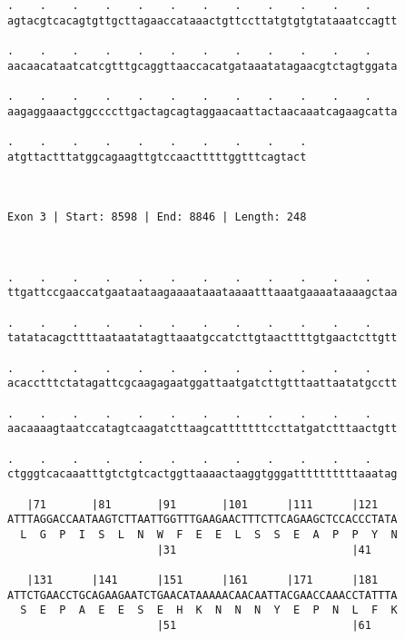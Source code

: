 \documentclass{article}
\begin{document}
\begin{Verbatim}
.    .    .    .    .    .    .    .    .    .    .    .    
agtacgtcacagtgttgcttagaaccataaactgttccttatgtgtgtataaatccagtt
                                                            
.    .    .    .    .    .    .    .    .    .    .    .    
aacaacataatcatcgtttgcaggttaaccacatgataaatatagaacgtctagtggata
                                                            
.    .    .    .    .    .    .    .    .    .    .    .    
aagaggaaactggccccttgactagcagtaggaacaattactaacaaatcagaagcatta
                                                            
.    .    .    .    .    .    .    .    .    .
atgttactttatggcagaagttgtccaactttttggtttcagtact
                                              
                                              
 
Exon 3 | Start: 8598 | End: 8846 | Length: 248



.    .    .    .    .    .    .    .    .    .    .    .    
ttgattccgaaccatgaataataagaaaataaataaaatttaaatgaaaataaaagctaa
                                                            
.    .    .    .    .    .    .    .    .    .    .    .    
tatatacagcttttaataatatagttaaatgccatcttgtaacttttgtgaactcttgtt
                                                            
.    .    .    .    .    .    .    .    .    .    .    .    
acacctttctatagattcgcaagagaatggattaatgatcttgtttaattaatatgcctt
                                                            
.    .    .    .    .    .    .    .    .    .    .    .    
aacaaaagtaatccatagtcaagatcttaagcatttttttccttatgatctttaactgtt
                                                            
.    .    .    .    .    .    .    .    .    .    .    .    
ctgggtcacaaatttgtctgtcactggttaaaactaaggtgggattttttttttaaatag
                                                            
   |71       |81       |91       |101      |111      |121   
ATTTAGGACCAATAAGTCTTAATTGGTTTGAAGAACTTTCTTCAGAAGCTCCACCCTATA
  L  G  P  I  S  L  N  W  F  E  E  L  S  S  E  A  P  P  Y  N
                       |31                           |41    
  
   |131      |141      |151      |161      |171      |181   
ATTCTGAACCTGCAGAAGAATCTGAACATAAAAACAACAATTACGAACCAAACCTATTTA
  S  E  P  A  E  E  S  E  H  K  N  N  N  Y  E  P  N  L  F  K
                       |51                           |61    
  

\end{Verbatim}
\end{document}
